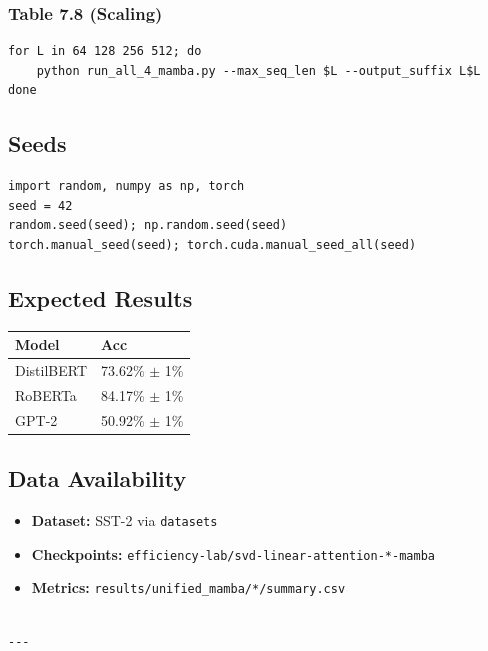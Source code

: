 \subsubsection{Table 7.8 (Scaling)}
\begin{lstlisting}
for L in 64 128 256 512; do
    python run_all_4_mamba.py --max_seq_len $L --output_suffix L$L
done
\end{lstlisting}

\subsection{Seeds}

\begin{lstlisting}
import random, numpy as np, torch
seed = 42
random.seed(seed); np.random.seed(seed)
torch.manual_seed(seed); torch.cuda.manual_seed_all(seed)
\end{lstlisting}

\subsection{Expected Results}

\begin{table}[H]
\centering
\small
\begin{tabular}{ll}
\toprule
\textbf{Model} & \textbf{Acc} \\
\midrule
DistilBERT & 73.62\% $\pm$ 1\% \\
RoBERTa & 84.17\% $\pm$ 1\% \\
GPT-2 & 50.92\% $\pm$ 1\% \\
\bottomrule
\end{tabular}
\end{table}

\subsection{Data Availability}

\begin{itemize}
\item \textbf{Dataset:} SST-2 via \texttt{datasets}
\item \textbf{Checkpoints:} \texttt{efficiency-lab/svd-linear-attention-*-mamba}
\item \textbf{Metrics:} \texttt{results/unified\_mamba/*/summary.csv}
\end{itemize}
\begin{lstlisting}

---
\end{lstlisting}